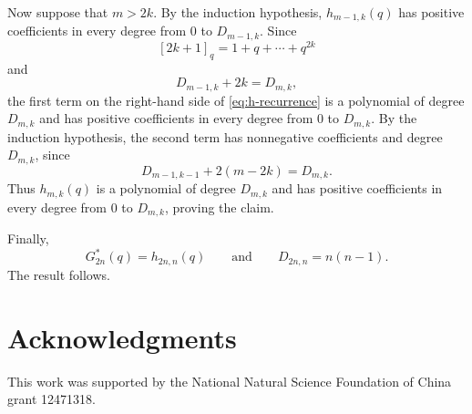 \documentclass[12pt]{article}
\numberwithin{equation}{section}
\theoremstyle{plain}
\begin{document}
	 			Now suppose that $m>2k$. By the induction hypothesis,
	 			$h_{m-1,k}(q)$ has positive coefficients in every degree from $0$ to
	 			$D_{m-1,k}$. Since
	 			\[
	 			[2k+1]_q=1+q+\cdots+q^{2k}
	 			\]
	 			and
	 			\[
	 			D_{m-1,k}+2k=D_{m,k},
	 			\]
	 			the first term on the right-hand side of \eqref{eq:h-recurrence} is a
	 			polynomial of degree $D_{m,k}$ and has positive coefficients in every
	 			degree from $0$ to $D_{m,k}$. By the induction hypothesis, the second
	 			term has nonnegative coefficients and degree $D_{m,k}$, since
	 			\[
	 			D_{m-1,k-1}+2(m-2k)=D_{m,k}.
	 			\]
	 			Thus $h_{m,k}(q)$ is a polynomial of degree $D_{m,k}$ and has positive
	 			coefficients in every degree from $0$ to $D_{m,k}$, proving the claim.
	 			
	 			Finally,
	 			\[
	 			G_{2n}^{*}(q)=h_{2n,n}(q)
	 			\qquad\text{and}\qquad
	 			D_{2n,n}=n(n-1).
	 			\]
	 			The result follows.
	 				 
   			    \section*{Acknowledgments}
   This work was supported by the National Natural Science
   Foundation of China grant 12471318.
  
  
  
  
 
	
	
\end{document}
